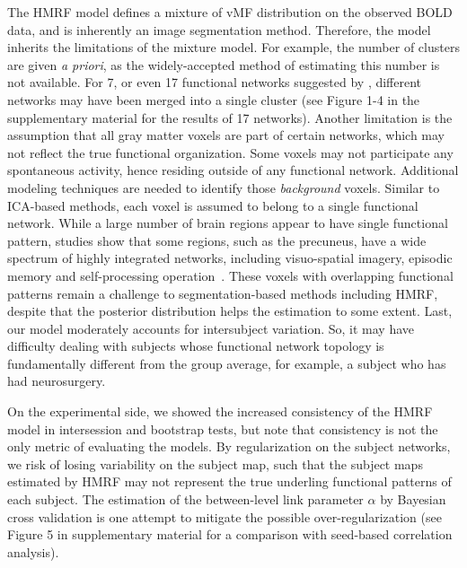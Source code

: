 \documentclass[review,authoryear]{elsarticle}
\begin{document}
The HMRF model defines a mixture of vMF distribution on the observed BOLD data,
and is inherently an image segmentation method. Therefore, the model inherits
the limitations of the mixture model. For example, the number of clusters are
given \emph{a priori}, as the widely-accepted method of estimating this number
is not available. For 7, or even 17 functional networks suggested by
\citet{yeo2011organization}, different networks may have been merged into a
single cluster (see Figure 1-4 in the supplementary material for the
results of 17 networks). Another limitation is the assumption that all gray matter voxels
are part of certain networks, which may not reflect the true functional
organization. Some voxels may not participate any spontaneous activity, hence
residing outside of any functional network. Additional modeling techniques are
needed to identify those \emph{background} voxels. Similar to ICA-based
methods, each voxel is assumed to belong to a single functional network. While a
large number of brain regions appear to have single functional pattern, studies
show that some regions, such as the precuneus, have a wide spectrum of highly
integrated networks, including visuo-spatial imagery, episodic memory and
self-processing operation~\citep{cavanna2006precuneus}. These voxels with
overlapping functional patterns remain a challenge to segmentation-based methods
including HMRF, despite that the posterior distribution helps the estimation to
some extent. Last, our model moderately accounts for intersubject variation. So,
it may have difficulty dealing with subjects whose functional network topology
is fundamentally different from the group average, for example, a subject who
has had neurosurgery. 

On the experimental side, we showed the increased consistency of the HMRF model in
intersession and bootstrap tests, but note that consistency is not the only
metric of evaluating the models. By regularization on the subject networks, we
risk of losing variability on the subject map, such that the subject maps
estimated by HMRF may not represent the true underling functional patterns of
each subject. The estimation of the between-level link parameter $\alpha$ by
Bayesian cross validation is one attempt to mitigate the possible
over-regularization (see Figure 5 in supplementary material for a comparison
with seed-based correlation analysis).
\end{document}

